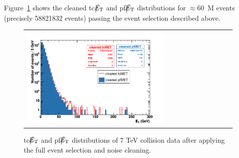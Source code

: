 Figure~\ref{fig:met} shows the cleaned tc$\big\slash\hspace{-1.6ex}{E_\text{T}}$ and pf$\big\slash\hspace{-1.6ex}{E_\text{T}}$ distributions for $\approx 60$~M events 
(precisely 58821832 events) passing the event selection described above.
\begin{figure}[h]
 \centering
 \begin{tabular}{ll}
   \includegraphics[width=0.7\textwidth]{fig/met.pdf} 
 \end{tabular}
\caption{tc$\big\slash\hspace{-1.6ex}{E_\text{T}}$ and pf$\big\slash\hspace{-1.6ex}{E_\text{T}}$ distributions of 7 TeV collision data after applying the full event selection and noise cleaning.}
\label{fig:met}
\end{figure}
